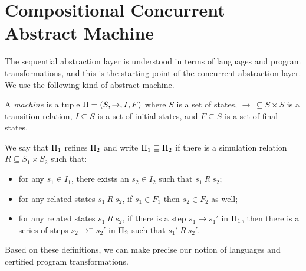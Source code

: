 \section{Compositional Concurrent Abstract Machine}
\label{sec:layer}
The sequential abstraction layer
is understood 
in terms of languages and program transformations,
and this is the starting point
of the concurrent abstraction layer.
We use the following kind of abstract machine.

\begin{definition}[Machine]
\label{def:mach}
A \emph{machine} is a tuple $\Pi = (S, \rightarrow, I, F)$
where $S$ is a set of states,
$\rightarrow \, \subseteq S \times S$ is a transition relation,
$I \subseteq S$ is a set of initial states, and
$F \subseteq S$ is a set of final states.
\end{definition}


\begin{definition}[Refinement]
We say that {\small$\Pi_1$} refines {\small $\Pi_2$}
and write {\small $\Pi_1 \sqsubseteq \Pi_2$}
if there is a simulation relation {\small $R \subseteq S_1 \times S_2$}
such that:
\begin{itemize}
\item for any $s_1 \in I_1$,
	there exists an $s_2 \in I_2$
	such that $s_1 \ R\ s_2$;
\item for any related states $s_1\ R\ s_2$, %
	if $s_1 \in F_1$ then $s_2 \in F_2$ as well;
\item for any related states $s_1\ R\ s_2$, %
	if there is a step $s_1 \rightarrow s_1'$ in $\Pi_1$,
	then there is a series of steps $s_2 \rightarrow^+ s_2'$ in $\Pi_2$
	such that $s_1'\ R\ s_2'$.
\end{itemize}
\end{definition}

Based on these definitions,
we can make precise our notion of languages and
certified program transformations.

